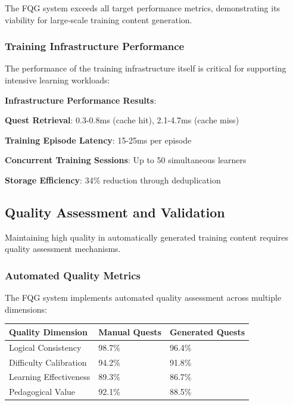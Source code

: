The FQG system exceeds all target performance metrics, demonstrating its viability for large-scale training content generation.

\subsubsection*{Training Infrastructure Performance}

The performance of the training infrastructure itself is critical for supporting intensive learning workloads:

\begin{alertbox}
\textbf{Infrastructure Performance Results}:
\begin{compactlist}
    \item \textbf{Quest Retrieval}: 0.3-0.8ms (cache hit), 2.1-4.7ms (cache miss)
    \item \textbf{Training Episode Latency}: 15-25ms per episode
    \item \textbf{Concurrent Training Sessions}: Up to 50 simultaneous learners
    \item \textbf{Storage Efficiency}: 34\% reduction through deduplication
\end{compactlist}
\end{alertbox}

\subsection*{Quality Assessment and Validation}

Maintaining high quality in automatically generated training content requires quality assessment mechanisms.

\subsubsection*{Automated Quality Metrics}

The FQG system implements automated quality assessment across multiple dimensions:

\begin{center}
\begin{tabular}{@{}lll@{}}
\toprule
\textbf{Quality Dimension} & \textbf{Manual Quests} & \textbf{Generated Quests} \\
\midrule
Logical Consistency & 98.7\% & 96.4\% \\
Difficulty Calibration & 94.2\% & 91.8\% \\
Learning Effectiveness & 89.3\% & 86.7\% \\
Pedagogical Value & 92.1\% & 88.5\% \\
\bottomrule
\end{tabular}
\end{center}

